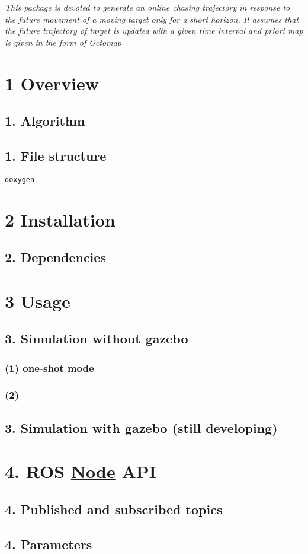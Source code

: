

{\itshape This package is devoted to generate an online chasing trajectory in response to the future movement of a moving target only for a short horizon. It assumes that the future trajectory of target is updated with a given time interval and priori map is given in the form of Octomap}

\section*{1 Overview}

\subsection*{1. Algorithm}



\subsection*{1. File structure}

\href{https://icsl-jeon.github.io/}{\tt doxygen}

\section*{2 Installation}

\subsection*{2. Dependencies}

\section*{3 Usage}

\subsection*{3. Simulation without gazebo}

\subsubsection*{(1) one-\/shot mode}

\subsubsection*{(2)}

\subsection*{3. Simulation with gazebo (still developing)}

\section*{4. R\+OS \hyperlink{struct_node}{Node} A\+PI}

\subsection*{4. Published and subscribed topics}

\subsection*{4. Parameters}